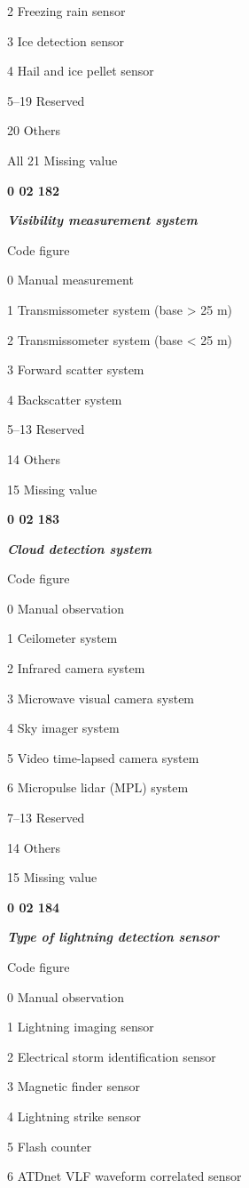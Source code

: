 2 Freezing rain sensor

3 Ice detection sensor

4 Hail and ice pellet sensor

5--19 Reserved

20 Others

All 21 Missing value

\textbf{0 02 182}

\emph{\textbf{Visibility measurement system}}

Code figure

0 Manual measurement

1 Transmissometer system (base \textgreater{} 25 m)

2 Transmissometer system (base \textless{} 25 m)

3 Forward scatter system

4 Backscatter system

5--13 Reserved

14 Others

15 Missing value

\textbf{0 02 183}

\emph{\textbf{Cloud detection system}}

Code figure

0 Manual observation

1 Ceilometer system

2 Infrared camera system

3 Microwave visual camera system

4 Sky imager system

5 Video time-lapsed camera system

6 Micropulse lidar (MPL) system

7--13 Reserved

14 Others

15 Missing value

\textbf{0 02 184}

\emph{\textbf{Type of lightning detection sensor}}

Code figure

0 Manual observation

1 Lightning imaging sensor

2 Electrical storm identification sensor

3 Magnetic finder sensor

4 Lightning strike sensor

5 Flash counter

6 ATDnet VLF waveform correlated sensor

